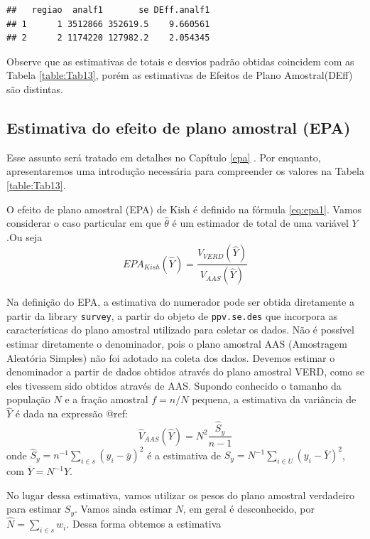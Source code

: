 \documentclass[]{book}
\numberwithin{example}{chapter}
\numberwithin{remark}{chapter}
\numberwithin{definition}{chapter}
\begin{document}
\begin{verbatim}
##   regiao  analf1       se DEff.analf1
## 1      1 3512866 352619.5    9.660561
## 2      2 1174220 127982.2    2.054345
\end{verbatim}

Observe que as estimativas de totais e desvios padrão obtidas coincidem
com as Tabela \ref{table:Tab13}, porém as estimativas de Efeitos de
Plano Amostral(DEff) são distintas.

\subsection{Estimativa do efeito de plano amostral
(EPA)}\label{estimativa-do-efeito-de-plano-amostral-epa}

Esse assunto será tratado em detalhes no Capítulo \ref{epa} . Por
enquanto, apresentaremos uma introdução necessária para compreender os
valores na Tabela \ref{table:Tab13}.

O efeito de plano amostral (EPA) de Kish é definido na fórmula
\eqref{eq:epa1}. Vamos considerar o caso particular em que
\(\hat{\theta}\) é um estimador de total de uma variável \(Y\).Ou seja
\[
EPA_{Kish}\left(\widehat{Y}\right)=\frac{V_{VERD}\left(\widehat{Y}\right)}{V_{AAS}\left(\widehat{Y}\right)}
\]

Na definição do EPA, a estimativa do numerador pode ser obtida
diretamente a partir da library \texttt{survey}, a partir do objeto de
\texttt{ppv.se.des} que incorpora as características do plano amostral
utilizado para coletar os dados. Não é possível estimar diretamente o
denominador, pois o plano amostral AAS (Amostragem Aleatória Simples)
não foi adotado na coleta dos dados. Devemos estimar o denominador a
partir de dados obtidos através do plano amostral VERD, como se eles
tivessem sido obtidos através de AAS. Supondo conhecido o tamanho da
população \(N\) e a fração amostral \(f=n/N\) pequena, a estimativa da
variância de \(\widehat{Y}\) é dada na expressão @ref:\label{eq:estpa9} \[
\widehat{V}_{AAS}\left(\widehat{Y}\right)=N^2\frac{\widehat{S}_y}{n-1}
\] onde
\(\widehat{S}_y= n^{-1}\sum_{i\in s}\left(y_i-\overline{y}\right)^2\) é
a estimativa de
\(S_y=N^{-1}\sum_{i\in U}\left(y_i-\overline{Y}\right)^2\), com
\(\overline{Y}=N^{-1}Y\).

No lugar dessa estimativa, vamos utilizar os pesos do plano amostral
verdadeiro para estimar \(S_y\). Vamos ainda estimar \(N\), em geral é
desconhecido, por \(\widehat{N}=\sum_{i \in s} w_i\). Dessa forma
obtemos a estimativa
\end{document}
